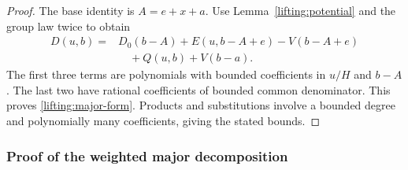 \begin{proof}
The base identity is $A=e+x+a$.  Use
Lemma~\ref{lifting:potential} and the group law twice to obtain
\begin{align*}
 D(u,b)={}&D_0(b-A)+E(u,b-A+e)-V(b-A+e)\\
           &\quad+Q(u,b)+V(b-a).
\end{align*}
The first three terms are polynomials with bounded coefficients in
$u/H$ and $b-A$.  The last two have rational coefficients of bounded
common denominator.  This proves \eqref{lifting:major-form}.
Products and substitutions involve a bounded degree and polynomially
many coefficients, giving the stated bounds.
\end{proof}

\subsubsection{Proof of the weighted major decomposition}

